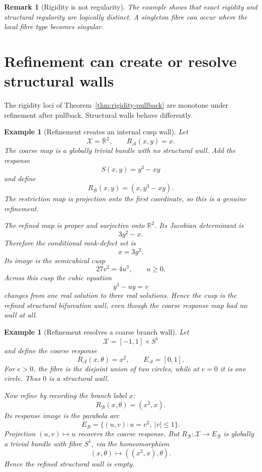 \documentclass[11pt]{article}
\newtheorem{example}[definition]{Example}
\newtheorem{remark}[definition]{Remark}
\newcommand{\X}{\mathcal X}
\newcommand{\Acal}{\mathcal A}
\newcommand{\Bcal}{\mathcal B}
\begin{document}
\begin{remark}[Rigidity is not regularity]
The example shows that exact rigidity and structural regularity are logically
distinct. A singleton fibre can occur where the local fibre type becomes
singular.
\end{remark}

\section{Refinement can create or resolve structural walls}

The rigidity loci of Theorem~\ref{thm:rigidity-pullback} are monotone under
refinement after pullback. Structural walls behave differently.

\begin{example}[Refinement creates an internal cusp wall]
Let
\[
\X=\mathbb R^2,
\qquad
R_{\Acal}(x,y)=x.
\]
The coarse map is a globally trivial bundle with no structural wall.
Add the response
\[
S(x,y)=y^3-xy
\]
and define
\[
R_{\Bcal}(x,y)=(x,y^3-xy).
\]
The restriction map is projection onto the first coordinate, so this is a
genuine refinement.

The refined map is proper and surjective onto \(\mathbb R^2\). Its Jacobian
determinant is
\[
3y^2-x.
\]
Therefore the conditional rank-defect set is
\[
x=3y^2.
\]
Its image is the semicubical cusp
\[
27v^2=4u^3,
\qquad u\ge0.
\]
Across this cusp the cubic equation
\[
y^3-uy=v
\]
changes from one real solution to three real solutions. Hence the cusp is the
refined structural bifurcation wall, even though the coarse response map had
no wall at all.
\end{example}

\begin{example}[Refinement resolves a coarse branch wall]
Let
\[
\X=[-1,1]\times S^1
\]
and define the coarse response
\[
R_{\Acal}(x,\theta)=x^2,
\qquad
E_{\Acal}=[0,1].
\]
For \(e>0\), the fibre is the disjoint union of two circles, while at
\(e=0\) it is one circle. Thus \(0\) is a structural wall.

Now refine by recording the branch label \(x\):
\[
R_{\Bcal}(x,\theta)=(x^2,x).
\]
Its response image is the parabola arc
\[
E_{\Bcal}
=
\{(u,v):u=v^2,\ |v|\le1\}.
\]
Projection \((u,v)\mapsto u\) recovers the coarse response. But
\(R_{\Bcal}:\X\to E_{\Bcal}\) is globally a trivial bundle with fibre
\(S^1\), via the homeomorphism
\[
(x,\theta)\longmapsto ((x^2,x),\theta).
\]
Hence the refined structural wall is empty.
\end{example}
\end{document}
